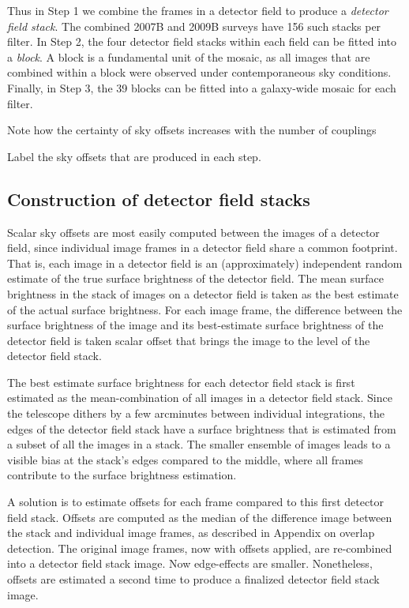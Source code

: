 \documentclass[iop]{emulateapj}
\newcommand{\todo}[1]{\textcolor{RedOrange}{#1}} %
\begin{document}
Thus in Step 1 we combine the frames in a detector field to produce a \emph{detector field stack}. The combined 2007B and 2009B surveys have 156 such stacks per filter. In Step 2, the four detector field stacks within each field can be fitted into a \emph{block}. A block is a fundamental unit of the mosaic, as all images that are combined within a block were observed under contemporaneous sky conditions. Finally, in Step 3, the 39 blocks can be fitted into a galaxy-wide mosaic for each filter.

\todo{Note how the certainty of sky offsets increases with the number of couplings}

\todo{Label the sky offsets that are produced in each step.}

\subsection{Construction of detector field stacks}
\label{sec:stacks}

Scalar sky offsets are most easily computed between the images of a detector field, since individual image frames in a detector field share a common footprint. That is, each image in a detector field is an (approximately) independent random estimate of the true surface brightness of the detector field. The mean surface brightness in the stack of images on a detector field is taken as the best estimate of the actual surface brightness. For each image frame, the difference between the surface brightness of the image and its best-estimate surface brightness of the detector field is taken scalar offset that brings the image to the level of the detector field stack.

The best estimate surface brightness for each detector field stack is first estimated as the mean-combination of all images in a detector field stack.  Since the telescope dithers by a few arcminutes between individual integrations, the edges of the detector field stack have a surface brightness that is estimated from a subset of all the images in a stack. The smaller ensemble of images leads to a visible bias at the stack's edges compared to the middle, where all frames contribute to the surface brightness estimation.

A solution is to estimate offsets for each frame compared to this first detector field stack. Offsets are computed as the median of the difference image between the stack and individual image frames, as described in \todo{Appendix on overlap detection}. The original image frames, now with offsets applied, are re-combined into a detector field stack image. Now edge-effects are smaller. Nonetheless, offsets are estimated a second time to produce a finalized detector field stack image.
\end{document}
